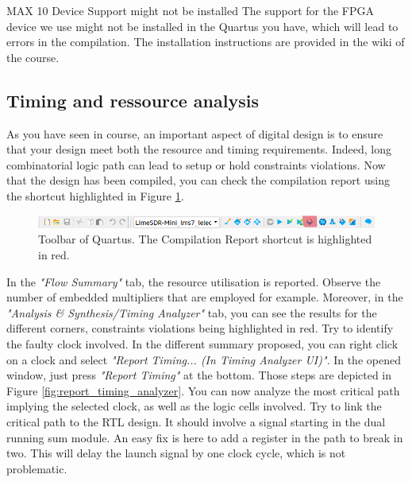 \begin{bclogo}[couleur = gray!20, arrondi = 0.2, logo=\bcattention]{MAX 10 Device Support might not be installed}
    The support for the FPGA device we use might not be installed in the Quartus you have, which will lead to errors in the compilation. The installation instructions are provided in the wiki of the course.

\end{bclogo}

\subsection{Timing and ressource analysis}

As you have seen in course, an important aspect of digital design is to ensure that your design meet both the resource and timing requirements. Indeed, long combinatorial logic path can lead to setup or hold constraints violations. Now that the design has been compiled, you can check the compilation report using the shortcut highlighted in Figure \ref{fig:compilation_report_button}. 

\begin{figure}[h]
    \centering
    \includegraphics[width=\linewidth]{figures/Compilation_report_button.PNG}
    \caption{Toolbar of Quartus. The Compilation Report shortcut is highlighted in red.}
    \label{fig:compilation_report_button}
\end{figure}


In the \textit{"Flow Summary"} tab, the resource utilisation is reported. Observe the  number of embedded multipliers that are employed for example. Moreover, in the \textit{"Analysis \& Synthesis/Timing Analyzer"} tab, you can see the results for the different corners, constraints violations being highlighted in red. Try to identify the faulty clock involved. In the different summary proposed, you can right click on a clock and select \textit{"Report Timing... (In Timing Analyzer UI)"}. In the opened window, just press \textit{"Report Timing"} at the bottom. Those steps are depicted in Figure \ref{fig:report_timing_analyzer}. You can now analyze the most critical path implying the selected clock, as well as the logic cells involved. Try to link the critical path to the RTL design. It should involve a signal starting in the dual running sum module. An easy fix is here to add a register in the path to break in two. This will delay the launch signal by one clock cycle, which is not problematic. 

